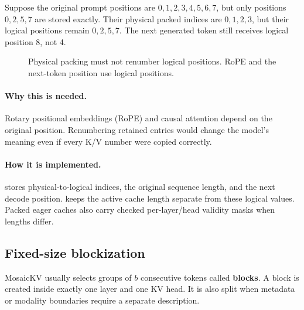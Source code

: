 \documentclass[11pt]{article}
\newcommand{\code}[1]{\texttt{\detokenize{#1}}}
\newcommand{\term}[1]{\textbf{#1}}
\newcommand{\why}{\paragraph{Why this is needed.}}
\newcommand{\how}{\paragraph{How it is implemented.}}
\begin{document}
Suppose the original prompt positions are $0,1,2,3,4,5,6,7$, but only positions $0,2,5,7$ are
stored exactly. Their physical packed indices are $0,1,2,3$, but their logical positions remain
$0,2,5,7$. The next generated token still receives logical position 8, not 4.

\begin{figure}[htbp]
\centering
{}
\caption{Physical packing must not renumber logical positions. RoPE and the next-token position
use logical positions.}
\label{fig:positions}
\end{figure}

\why Rotary positional embeddings (RoPE) and causal attention depend on the original position.
Renumbering retained entries would change the model's meaning even if every K/V number were copied
correctly.

\how \code{LogicalPositionMap} stores physical-to-logical indices, the original sequence length,
and the next decode position. \code{DecodeState} keeps the active cache length separate from these
logical values. Packed eager caches also carry checked per-layer/head validity masks when lengths
differ.

\subsection{Fixed-size blockization}

MosaicKV usually selects groups of $b$ consecutive tokens called \term{blocks}. A block is created
inside exactly one layer and one KV head. It is also split when metadata or modality boundaries
require a separate description.
\end{document}
